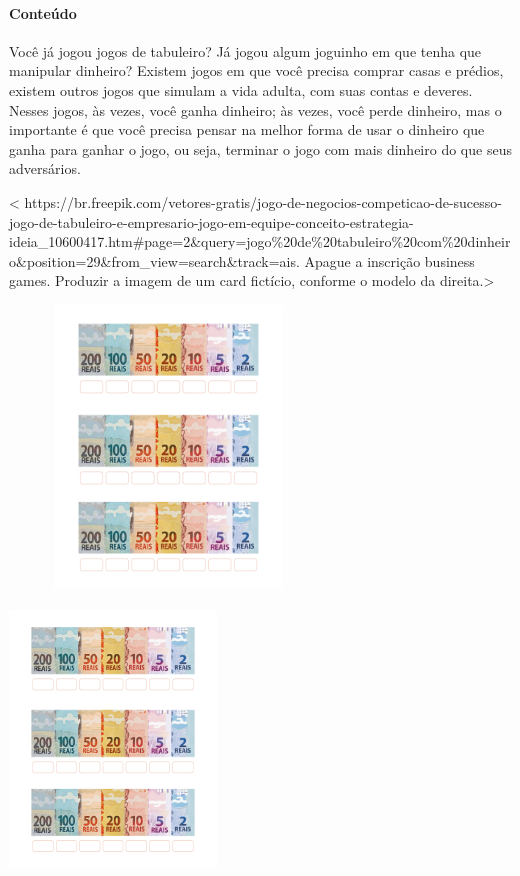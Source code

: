 \paragraph{Conteúdo}\label{conteuxfado-4}

Você já jogou jogos de tabuleiro? Já jogou algum joguinho em que tenha
que manipular dinheiro? Existem jogos em que você precisa comprar casas
e prédios, existem outros jogos que simulam a vida adulta, com suas
contas e deveres. Nesses jogos, às vezes, você ganha dinheiro; às vezes,
você perde dinheiro, mas o importante é que você precisa pensar na
melhor forma de usar o dinheiro que ganha para ganhar o jogo, ou seja,
terminar o jogo com mais dinheiro do que seus adversários.

\textless{}
https://br.freepik.com/vetores-gratis/jogo-de-negocios-competicao-de-sucesso-jogo-de-tabuleiro-e-empresario-jogo-em-equipe-conceito-estrategia-ideia\_10600417.htm\#page=2\&query=jogo\%20de\%20tabuleiro\%20com\%20dinheiro\&position=29\&from\_view=search\&track=ais.
Apague a inscrição business games. Produzir a imagem de um card
fictício, conforme o modelo da direita.\textgreater{}

\includegraphics[width=3.33025in,height=2.95560in]{media/image68.png}\includegraphics[width=2.16667in,height=3.03125in]{media/image69.png}

